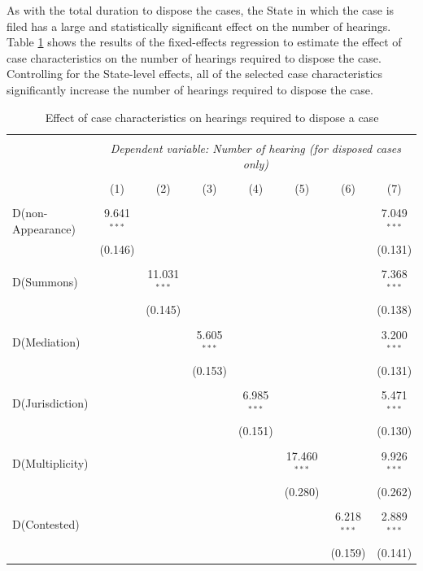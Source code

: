 \documentclass[12pt,a4paper]{article}
\begin{document}
As with the total duration to dispose the cases, the State in which the case is filed has a large and statistically significant effect on the number of hearings. Table \ref{tab:hearings_regression} shows the results of the fixed-effects regression to estimate the effect of case characteristics on the number of hearings required to dispose the case. Controlling for the State-level effects, all of the selected case characteristics significantly increase the number of hearings required to dispose the case.

{\footnotesize
 \begin{longtable}{lccccccc}
 \caption{Effect of case characteristics on hearings required to dispose a case}\label{tab:hearings_regression}\\
 \\[-1.8ex]
 \hline \\[-1.8ex] 
 & \multicolumn{7}{c}{\textit{Dependent variable: Number of hearing (for disposed cases only)}} \\ 
 \cline{2-8} 
 \\[-1.8ex] & (1) & (2) & (3) & (4) & (5) & (6) & (7)\\ 
 \hline \\[-1.8ex]
 D(non-Appearance) & 9.641$^{***}$ & & & & & & 7.049$^{***}$ \\ 
 & (0.146) & & & & & & (0.131) \\ 
 & & & & & & & \\ 
 D(Summons) & & 11.031$^{***}$ & & & & & 7.368$^{***}$ \\ 
 & & (0.145) & & & & & (0.138) \\ 
 & & & & & & & \\ 
 D(Mediation) & & & 5.605$^{***}$ & & & & 3.200$^{***}$ \\ 
 & & & (0.153) & & & & (0.131) \\ 
 & & & & & & & \\ 
 D(Jurisdiction) & & & & 6.985$^{***}$ & & & 5.471$^{***}$ \\ 
 & & & & (0.151) & & & (0.130) \\ 
 & & & & & & & \\ 
 D(Multiplicity) & & & & & 17.460$^{***}$ & & 9.926$^{***}$ \\ 
 & & & & & (0.280) & & (0.262) \\ 
 & & & & & & & \\ 
 D(Contested) & & & & & & 6.218$^{***}$ & 2.889$^{***}$ \\ 
 & & & & & & (0.159) & (0.141) \\ 

\end{longtable}}
\end{document}
